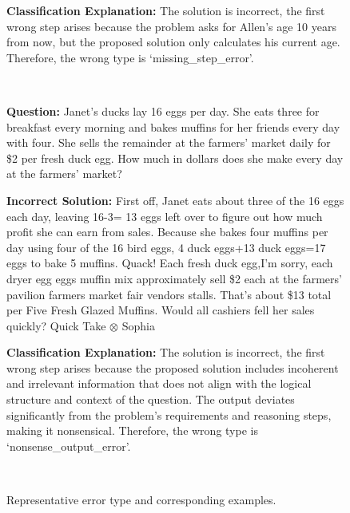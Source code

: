 \begin{figure}[!ht]
\begin{minipage}{0.9\textwidth}
\begin{tcolorbox}[boxrule=0.5mm, left=1mm, right=1mm, top=1mm, bottom=1mm,title=\textbf{Missing Step Error}]
            \textbf{Classification Explanation:}
            The solution is incorrect, the first wrong step arises because the problem asks for Allen's age 10 years from now, but the proposed solution only calculates his current age. Therefore, the wrong type is `missing\_step\_error'.


        \end{tcolorbox}
    \end{minipage}
    \\
    \begin{minipage}{0.9\textwidth}
        \begin{tcolorbox}[boxrule=0.5mm, left=1mm, right=1mm, top=1mm, bottom=1mm,title=\textbf{Nonsense Output Error}]
            \textbf{Question:}
            Janet’s ducks lay 16 eggs per day. She eats three for breakfast every morning and bakes muffins for her friends every day with four. She sells the remainder at the farmers' market daily for \$2 per fresh duck egg. How much in dollars does she make every day at the farmers' market?

            \textbf{Incorrect Solution:}
            First off, Janet eats about three of the 16 eggs each day, leaving 16-3= 13 eggs left over to figure out how much profit she can earn from sales. Because she bakes four muffins per day using four of the 16 bird eggs, 4 duck eggs+13 duck eggs=17 eggs to bake 5 muffins. Quack! Each fresh duck egg,I'm sorry, each dryer egg eggs muffin mix approximately sell \$2 each at the farmers' pavilion farmers market fair vendors stalls. That's about \$13 total per Five Fresh Glazed Muffins. Would all cashiers fell her sales quickly? Quick Take $\otimes$ Sophia
            
            \textbf{Classification Explanation:}
            The solution is incorrect, the first wrong step arises because the proposed solution includes incoherent and irrelevant information that does not align with the logical structure and context of the question. The output deviates significantly from the problem's requirements and reasoning steps, making it nonsensical. Therefore, the wrong type is `nonsense\_output\_error'.

        \end{tcolorbox}
    \end{minipage}
    \\

    \caption{Representative error type and corresponding examples.}
    \label{fig:error_type_examples}
\end{figure}